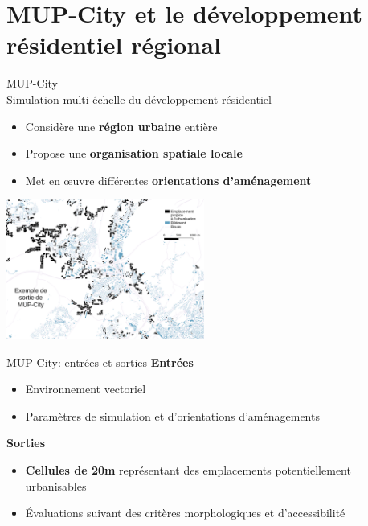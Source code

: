\documentclass[xcolor=table]{beamer}
\begin{document}
\section[MUP-City]{MUP-City et le développement résidentiel régional}


\begin{frame}{MUP-City}
	\\
	Simulation multi-échelle du développement résidentiel 
	\begin{itemize}
		\item Considère une \textbf{région urbaine} entière
		\item Propose une \textbf{organisation spatiale locale}
		\item Met en œuvre différentes \textbf{orientations d'aménagement}
	\end{itemize}
	\includegraphics[width=6.5cm]{Images/ex-sorties-mup.png}
\end{frame}

\begin{frame}{MUP-City: entrées et sorties}
	\textbf{Entrées}
	\begin{itemize}
		\item Environnement vectoriel 
		\item Paramètres de simulation et d'orientations d'aménagements
	\end{itemize}
	\textbf{Sorties}
	\begin{itemize}
		\item \textbf{Cellules de 20m} représentant des emplacements potentiellement urbanisables
		\item Évaluations suivant des critères morphologiques et d'accessibilité
	\end{itemize}
	\begin{block}{}\end{block}
\end{frame}
\end{document}
